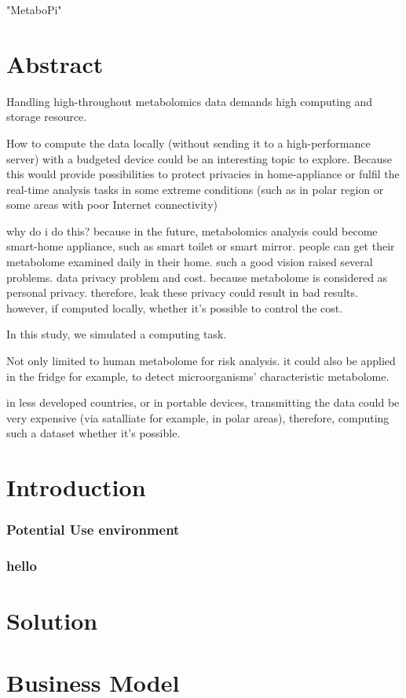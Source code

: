 "MetaboPi"

\section{Abstract}
Handling high-throughout metabolomics data demands high computing and storage resource.  

How to compute the data locally (without sending it to a high-performance server) with a budgeted device could be an interesting topic to explore. 
Because this would provide possibilities to protect privacies in home-appliance or fulfil the real-time analysis tasks in some extreme conditions (such as in polar region or some areas with poor Internet connectivity)


why do i do this? because in the future, metabolomics analysis could become smart-home appliance, such as smart toilet or smart mirror. 
people can get their metabolome examined daily in their home.
such a good vision raised several problems. data privacy problem and cost.
because metabolome is considered as personal privacy. therefore, leak these privacy could result in bad results. however, if computed locally, whether it's possible to control the cost.

In this study, we simulated a computing task. 


Not only limited to human metabolome for risk analysis. it could also be applied in the fridge for example, to detect microorganisms' characteristic metabolome.

in less developed countries, or in portable devices, transmitting the data could be very expensive (via satalliate for example, in polar areas), therefore, computing such a dataset whether it's possible. 

\section{Introduction}
\subsubsection{Potential Use environment}
\subsubsection{hello}

\section{Solution}

\section{Business Model}